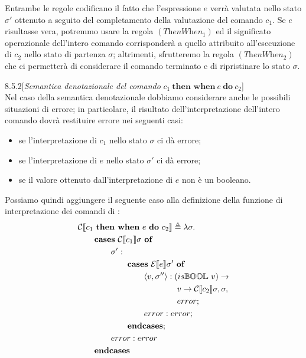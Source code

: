 Entrambe le regole codificano il fatto che l'espressione $e$ verrà valutata nello stato $\sigma'$ ottenuto a seguito del completamento della valutazione del comando $c_1$. Se $e$ risultasse vera, potremmo usare la regola $(\textit{ThenWhen}_1)$ ed il significato operazionale dell'intero comando corrisponderà a quello attribuito all'esecuzione di $c_2$ nello stato di partenza $\sigma$; altrimenti, sfrutteremo la regola $(\textit{ThenWhen}_2)$ che ci permetterà di considerare il comando terminato e di ripristinare lo stato $\sigma$.

\begin{customexe}{8.5.2}[\textit{Semantica denotazionale del comando} $c_1 \ \textbf{then when} \ e \ \textbf{do} \ c_2$] \label{es:8.5.2} \hfill \\
Nel caso della semantica denotazionale dobbiamo considerare anche le possibili situazioni di errore; in particolare, il risultato dell'interpretazione dell'intero comando dovrà restituire errore nei seguenti casi:
\begin{itemize}
\item se l'interpretazione di $c_1$ nello stato $\sigma$ ci dà errore;
\item se l'interpretazione di $e$ nello stato $\sigma'$ ci dà errore;
\item se il valore ottenuto dall'interpretazione di $e$ non è un booleano.
\end{itemize}
Possiamo quindi aggiungere il seguente caso alla definizione della funzione di interpretazione dei comandi di {\TINY}:
\begin{align*}
&\mathcal{C}\doublebracket{c_1 \ \textbf{then when} \ e \ \textbf{do} \ c_2} \triangleq \lambda{\sigma}. \\
&\tab \mathbf{cases} \ \mathcal{C}\doublebracket{c_1} \sigma \ \mathbf{of} \\
&\tab \tab \sigma': \\
&\tab \tab \tab \mathbf{cases} \ \mathcal{E}\doublebracket{e} \sigma' \ \mathbf{of} \\
&\tab \tab \tab \tab \tupla{v, \sigma''}: (is{\BOOL} \ v) \rightarrow \\
&\tab \tab \tab \tab \tab \tab v \rightarrow \mathcal{C}\doublebracket{c_2} \sigma, \sigma, \\
&\tab \tab \tab \tab \tab \tab error; \\
&\tab \tab \tab \tab error: error; \\
&\tab \tab \tab \mathbf{endcases}; \\
&\tab \tab error: error \\
&\tab \mathbf{endcases} \\
\end{align*}
\end{customexe}


